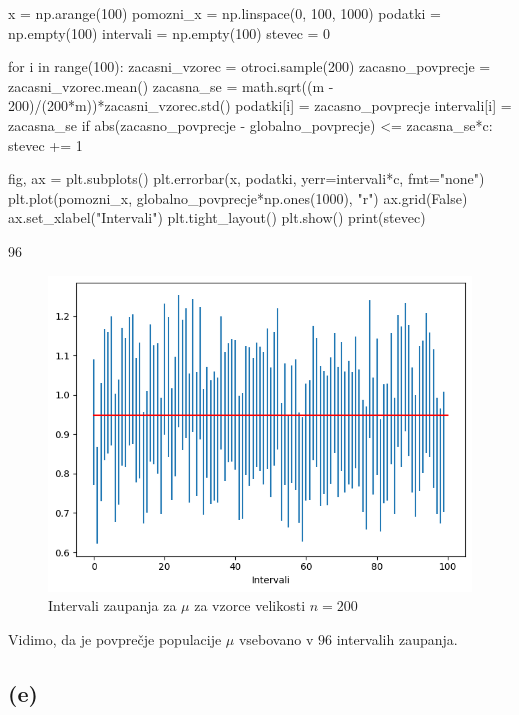 \documentclass[10pt, a4paper]{article}
\begin{document}
\begin{python}
    x = np.arange(100)
    pomozni_x = np.linspace(0, 100, 1000)
    podatki = np.empty(100)
    intervali = np.empty(100)
    stevec = 0

    for i in range(100):
        zacasni_vzorec = otroci.sample(200)
        zacasno_povprecje = zacasni_vzorec.mean()
        zacasna_se = math.sqrt((m - 200)/(200*m))*zacasni_vzorec.std()
        podatki[i] = zacasno_povprecje
        intervali[i] = zacasna_se
        if abs(zacasno_povprecje - globalno_povprecje) <= zacasna_se*c:
            stevec += 1

    fig, ax = plt.subplots()
    plt.errorbar(x, podatki, yerr=intervali*c, fmt="none")
    plt.plot(pomozni_x, globalno_povprecje*np.ones(1000), "r")
    ax.grid(False)
    ax.set_xlabel("Intervali")
    plt.tight_layout()
    plt.show()
    print(stevec)
\end{python}

\begin{python}
    96
\end{python}

\begin{figure}[H]
    \centering
    \includegraphics[scale=0.75]{Images/1c.png}
    \caption{Intervali zaupanja za $\mu$ za vzorce velikosti $n = 200$}
\end{figure}

Vidimo, da je povprečje populacije $\mu$ vsebovano v $96$ intervalih zaupanja.

\subsection*{(e)}
\end{document}
